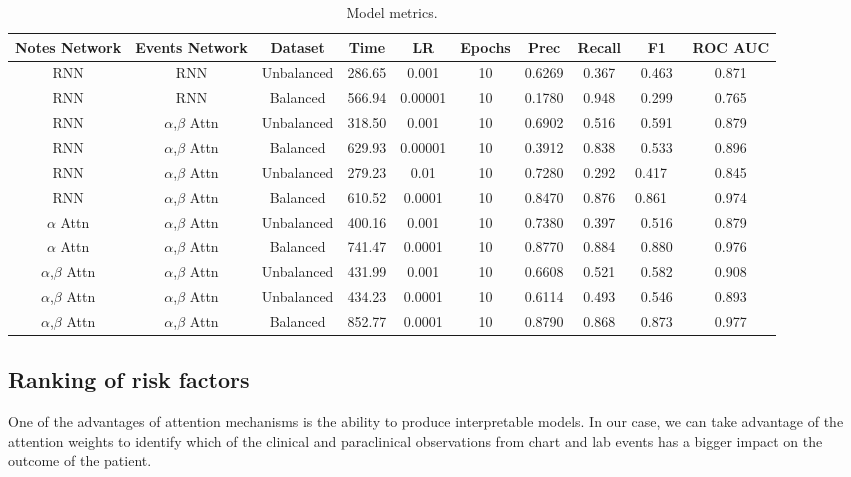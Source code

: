 \documentclass{sigkddExp}
\begin{document}
\begin{table}
       \centering
       \caption{Model metrics.}
       \label{tab:assessment}
       \begin{tabular}{|c|c|c|c|c|c|c|c|c|c|} \hline
              \textbf{Notes Network}&	\textbf{Events Network	}&\textbf{Dataset}&	\textbf{Time}&	\textbf{LR}&	\textbf{Epochs}&	\textbf{Prec}&	\textbf{Recall}&	\textbf{F1}&	\textbf{ROC AUC} \\ \hline
       RNN	&RNN	&Unbalanced	&286.65	&0.001	&10	&0.6269	&0.367	&0.463	&0.871 \\ \hline
       RNN	&RNN	&Balanced	&566.94	&0.00001	&10	&0.1780	&0.948	&0.299	&0.765 \\ \hline
       RNN	&$\alpha$,$\beta$ Attn&	Unbalanced	&318.50	&0.001	&10	&0.6902	&0.516	&0.591	&0.879 \\ \hline
       RNN	&$\alpha$,$\beta$ Attn&	Balanced	&629.93	&0.00001	&10	&0.3912	&0.838	&0.533	&0.896 \\ \hline
       RNN	&$\alpha$,$\beta$ Attn&	Unbalanced	&279.23	&0.01	&10	&0.7280	&0.292	&0.417	 &0.845 \\ \hline
       RNN	&$\alpha$,$\beta$ Attn&	Balanced	&610.52	&0.0001	&10	&0.8470	&0.876	&0.861	 &0.974 \\ \hline
       $\alpha$ Attn&$\alpha$,$\beta$ Attn&	Unbalanced	&400.16	&0.001	&10	&0.7380	&0.397	&0.516	&0.879 \\ \hline
       $\alpha$ Attn&$\alpha$,$\beta$ Attn&	Balanced	&741.47	&0.0001	&10	&0.8770	&0.884	&0.880	&0.976 \\ \hline
       $\alpha$,$\beta$ Attn& $\alpha$,$\beta$ Attn& Unbalanced	&431.99	&0.001	&10	&0.6608	&0.521	&0.582	&0.908 \\ \hline
       $\alpha$,$\beta$ Attn& $\alpha$,$\beta$ Attn& Unbalanced	&434.23	&0.0001	&10	&0.6114	&0.493	&0.546	&0.893 \\ \hline
       $\alpha$,$\beta$ Attn& $\alpha$,$\beta$ Attn& Balanced	&852.77 &0.0001	&10 &0.8790	&0.868	&0.873	&0.977 \\ \hline
       
       \end{tabular}
\end{table}

\subsection{Ranking of risk factors}
One of the advantages of attention mechanisms is the ability to produce interpretable models.  
In our case, we can take advantage of the attention weights to identify which of the clinical and 
paraclinical observations from chart and lab events has a bigger impact on the outcome of the patient.
\end{document}
